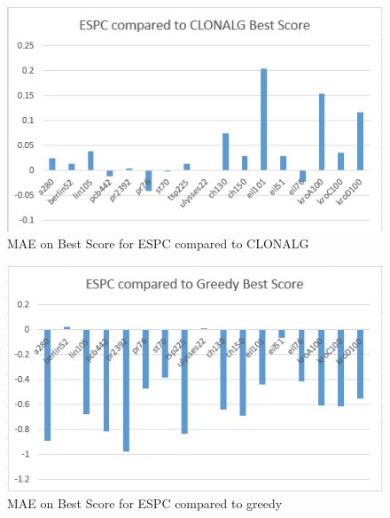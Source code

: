 \begin{figure}[H]
	\includegraphics[]{Images/ESPC_Fig_Best.png}
	\caption{MAE on Best Score for ESPC compared to CLONALG}
	\label{ESCP_Best}
\end{figure}
\begin{figure}[H]
	\includegraphics[]{Images/ESPC_Fig_greedy.png}
	\caption{MAE on Best Score for ESPC compared to greedy}
	\label{ESCP_greedy}
\end{figure}
